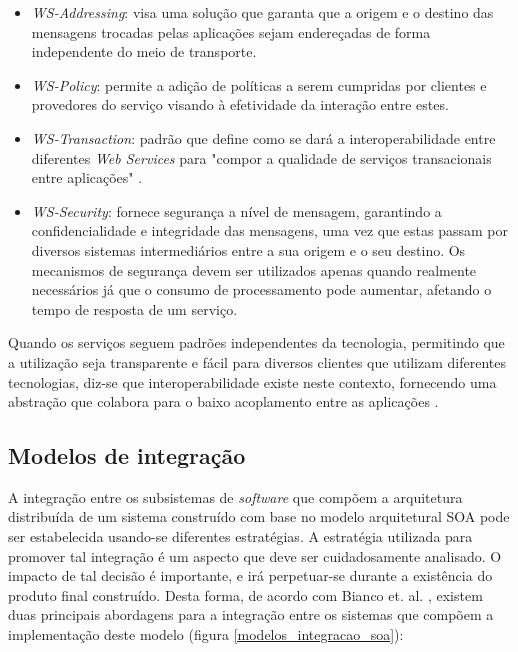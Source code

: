 \begin{itemize}
\item \textit{WS-Addressing}: visa uma solução que garanta que a origem e o destino das mensagens trocadas pelas aplicações sejam endereçadas de forma independente do meio de transporte.
\item \textit{WS-Policy}: permite a adição de políticas a serem cumpridas por clientes e provedores do serviço visando à efetividade da interação entre estes.
\item \textit{WS-Transaction}: padrão que define como se dará a interoperabilidade entre diferentes \textit{Web Services} para "compor a qualidade de serviços transacionais entre aplicações" \cite{oliveira_interoperabilidade}.
\item \textit{WS-Security}: fornece segurança a nível de mensagem, garantindo a confidencialidade e integridade das mensagens, uma vez que estas passam por diversos sistemas intermediários entre a sua origem e o seu destino. Os mecanismos de segurança devem ser utilizados apenas quando realmente necessários já que o consumo de processamento pode aumentar, afetando o tempo de resposta de um serviço.
\end{itemize}

Quando os serviços seguem padrões independentes da tecnologia, permitindo que a utilização seja transparente e fácil para diversos clientes que utilizam diferentes tecnologias, diz-se que interoperabilidade existe neste contexto, fornecendo uma abstração que colabora para o baixo acoplamento entre as aplicações \cite{oliveira_interoperabilidade}.

\subsection{Modelos de integração}
A integração entre os subsistemas de \textit{software} que compõem a arquitetura distribuída de um sistema construído com base no modelo arquitetural SOA pode ser estabelecida usando-se diferentes estratégias. A estratégia utilizada para promover tal integração é um aspecto que deve ser cuidadosamente analisado. O impacto de tal decisão é importante, e irá perpetuar-se durante a existência do produto final construído. Desta forma, de acordo com Bianco et. al. \cite{Bianco2007}, existem duas principais abordagens para a integração entre os sistemas que compõem a implementação deste modelo (figura \ref{modelos_integracao_soa}):

